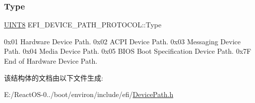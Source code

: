 \subsubsection{\texorpdfstring{Type}{Type}}
{\footnotesize\ttfamily \hyperlink{_processor_bind_8h_ab27e9918b538ce9d8ca692479b375b6a}{U\+I\+N\+T8} E\+F\+I\+\_\+\+D\+E\+V\+I\+C\+E\+\_\+\+P\+A\+T\+H\+\_\+\+P\+R\+O\+T\+O\+C\+O\+L\+::\+Type}

0x01 Hardware Device Path. 0x02 A\+C\+PI Device Path. 0x03 Messaging Device Path. 0x04 Media Device Path. 0x05 B\+I\+OS Boot Specification Device Path. 0x7F End of Hardware Device Path. 

该结构体的文档由以下文件生成\+:\begin{DoxyCompactItemize}
\item 
E\+:/\+React\+O\+S-\/0../boot/environ/include/efi/\hyperlink{_device_path_8h}{Device\+Path.\+h}\end{DoxyCompactItemize}
